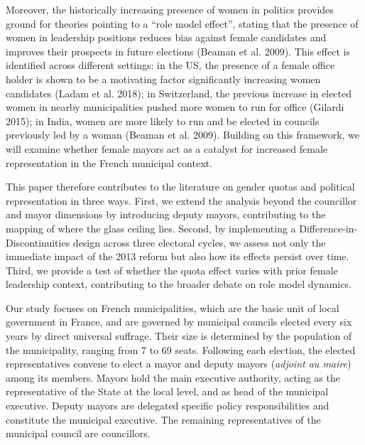 \documentclass[11pt,a4paper]{article}
\makeatletter
\renewcommand{\section}{\@startsection{section}{1}{0pt}{1.4em}{0.6em}{\normalfont\bfseries}}
\makeatother
\begin{document}
Moreover, the historically increasing presence of women in politics provides ground for theories pointing to a ``role model effect'', stating that the presence of women in leadership positions reduces bias against female candidates and improves their prospects in future elections (Beaman et al. 2009). This effect is identified across different settings: in the US, the presence of a female office holder is shown to be a motivating factor significantly increasing women candidates (Ladam et al. 2018); in Switzerland, the previous increase in elected women in nearby municipalities pushed more women to run for office (Gilardi 2015); in India, women are more likely to run and be elected in councils previously led by a woman (Beaman et al. 2009). Building on this framework, we will examine whether female mayors act as a catalyst for increased female representation in the French municipal context.

This paper therefore contributes to the literature on gender quotas and political representation in three ways. First, we extend the analysis beyond the councillor and mayor dimensions by introducing deputy mayors, contributing to the mapping of where the glass ceiling lies. Second, by implementing a Difference-in-Discontinuities design across three electoral cycles, we assess not only the immediate impact of the 2013 reform but also how its effects persist over time. Third, we provide a test of whether the quota effect varies with prior female leadership context, contributing to the broader debate on role model dynamics.

\section{INSTITUTIONAL BACKGROUND}

Our study focuses on French municipalities, which are the basic unit of local government in France, and are governed by municipal councils elected every six years by direct universal suffrage. Their size is determined by the population of the municipality, ranging from 7 to 69 seats. Following each election, the elected representatives convene to elect a mayor and deputy mayors (\textit{adjoint au maire}) among its members. Mayors hold the main executive authority, acting as the representative of the State at the local level, and as head of the municipal executive. Deputy mayors are delegated specific policy responsibilities and constitute the municipal executive. The remaining representatives of the municipal council are councillors.
\end{document}
